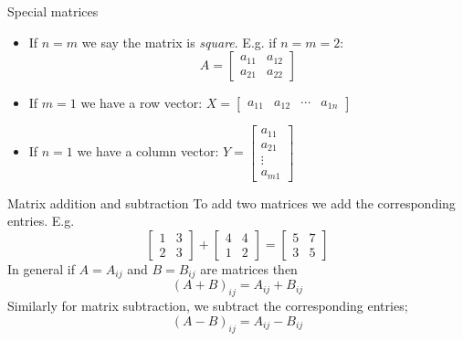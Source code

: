 \documentclass{beamer}
\begin{document}
\begin{frame}{Special matrices}
  \begin{itemize}
  \item If $n=m$ we say the matrix is \emph{square}. E.g. if $n=m=2$:
    \begin{equation*}
      A=\left[
        \begin{array}{cc}
          a_{11} & a_{12} \\
          a_{21} & a_{22}
        \end{array}
      \right]
    \end{equation*}\vfill
  \item If $m=1$ we have a row vector: $X= \left[\begin{array}{cccc} a_{11} & a_{12} & \cdots & a_{1n}\end{array} \right]$\vfill
  \item If $n=1$ we have a column vector: $Y= \left[\begin{array}{c} a_{11} \\ a_{21} \\ \vdots \\ a_{m1}\end{array} \right]$
  \end{itemize}
\end{frame}

\begin{frame}{Matrix addition and subtraction}
  To add two matrices we add the corresponding entries.
  E.g.
  \begin{equation*}
      \left[
        \begin{array}{cc}
          1 & 3 \\
          2 & 3
        \end{array}
      \right]+
      \left[
        \begin{array}{cc}
          4 & 4 \\
          1 & 2
        \end{array}
      \right] =
      \left[
        \begin{array}{cc}
          5 & 7 \\
          3 & 5
        \end{array}
      \right]
    \end{equation*}\vfill
    In general if $A = A_{ij}$ and $B = B_{ij}$ are matrices then
    \begin{equation*}
      (A + B)_{ij} = A_{ij}+B_{ij}
    \end{equation*}\vfill
    Similarly for matrix subtraction, we subtract the corresponding entries;
    \begin{equation*}
      (A-B)_{ij} = A_{ij}-B_{ij}
    \end{equation*}
\end{frame}
\end{document}
